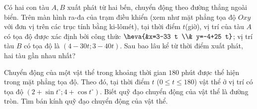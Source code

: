 \begin{bt}%
    Có hai con tàu $A, B$ xuất phát từ hai bến, chuyển động theo đường thẳng ngoài biển. Trên màn hình ra-đa của trạm điều khiển (xem như mặt phẳng tọa độ $O x y$ với đơn vị trên các trục tính bằng ki-lômét), tại thời điểm $t$(giờ), vị trí của tàu $A$ có tọa độ được xác định bởi công thức $\heva{&x=3-33 t \\& y=-4+25 t}$; vị trí tàu $B$ có tọa độ là $(4-30 t; 3-40 t)$. Sau bao lâu kể từ thời điểm xuất phát, hai tàu gần nhau nhất?
\end{bt}

\begin{bt}%
	Chuyển động của một vật thể trong khoảng thời gian $180$ phút được thể hiện trong mặt phẳng tọa độ. Theo đó, tại thời điểm $t$ ($0\le t\le 180$) vật thể ở vị trí có tọa độ $(2+\sin t^\circ;4+\cos t^\circ)$. Biết quỹ đạo chuyển động của vật thể là đường tròn. Tìm bán kính quỹ đạo chuyển động của vật thể.
\end{bt}

